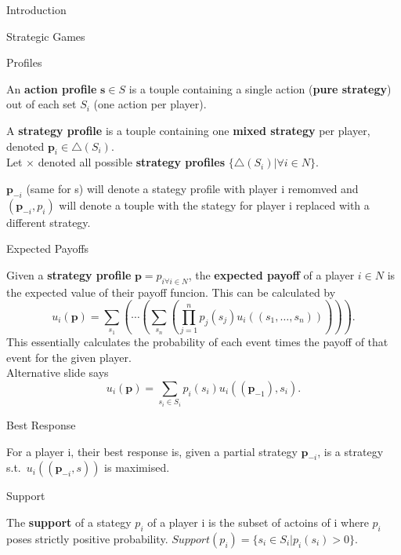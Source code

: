 \documentclass[12pt, letterpaper]{article}
\begin{document}
\begin{section}{Introduction}
\begin{subsection}{Strategic Games}
    \begin{subsubsection}{Profiles}

      An \textbf{action profile} \(\textbf{s} \in S\) is a touple containing a
      single action (\textbf{pure strategy}) out of each set \(S_{i}\) (one
      action per player).

      A \textbf{strategy profile} is a touple containing one \textbf{mixed
        strategy} per player, denoted \(\textbf{p}_{i} \in \triangle(S_{i})\).
      \\
      Let \(\times\) denoted all possible \textbf{strategy profiles}
      \(\{ \triangle(S_{i}) | \forall i \in N \}\).

      \(\textbf{p}_{-i}\) (same for s) will denote a stategy profile with
      player i remomved and \((\textbf{p}_{-i}, p_{i})\) will denote a touple
      with the stategy for player i replaced with a different strategy.

    \end{subsubsection}

    \begin{subsubsection}{Expected Payoffs}

      Given a \textbf{strategy profile} \(\textbf{p} = p_{i \forall i \in N}\),
      the \textbf{expected payoff} of a player \(i \in N\) is the expected
      value of their payoff funcion. This can be calculated by
      \[u_{i}(\textbf{p}) =
        \sum_{s_{1}}( \cdots (\sum_{s_{n}}(
        \prod^{n}_{j=1} p_{j}(s_{j}) u_{i}((s_{1}, \dots , s_{n}))))).\]
      This essentially calculates the probability of each event times the
      payoff of that event for the given player. \\
      Alternative slide says \[u_{i}(\textbf{p}) = \sum_{s_{i} \in S_{i}}
        p_{i}(s_{i}) u_{i}((\textbf{p}_{-1}), s_{i}).\]

    \end{subsubsection}

    \begin{subsubsection}{Best Response}

      For a player i, their best response is, given a partial strategy
      \(\textbf{p}_{-i}\), is a strategy s.t.\ \(u_{i}((\textbf{p}_{-i}, s))\)
      is maximised.

    \end{subsubsection}

    \begin{subsubsection}{Support}

      The \textbf{support} of a stategy \(p_{i}\) of a player i is the subset
      of actoins of i where \(p_{i}\) poses strictly positive probability.
      \(Support(p_{i}) = \{ s_{i} \in S_{i} | p_{i}(s_{i}) > 0\}\).


\end{subsubsection}
\end{subsection}
\end{section}
\end{document}
